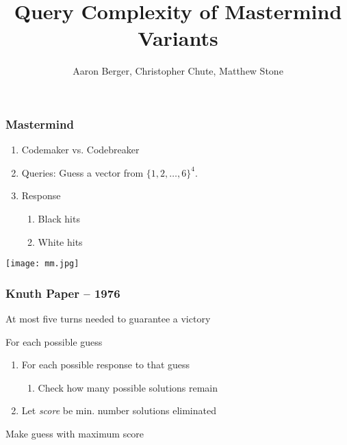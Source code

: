 \documentclass{beamer}
\title{Query Complexity of Mastermind Variants}
\author{Aaron Berger, Christopher Chute, Matthew Stone}
\begin{document}
    \begin{frame}
    	\maketitle
    \end{frame}

    \begin{frame}
    	\frametitle{Mastermind}
	   	\begin{enumerate}[label=\roman*.]
	    \item Codemaker vs. Codebreaker
	    \item Queries: Guess a vector from $\{1,2,\ldots,6\}^4$.	    		    
	    \item Response
	    	\begin{enumerate}[label=\roman*.]
			\item Black hits
			\item White hits
			\end{enumerate}
   	    \end{enumerate}
	\begin{center}
	\texttt{[image: mm.jpg]}
	\end{center}
    \end{frame}

    \begin{frame}
    	\frametitle{Knuth Paper -- 1976}
		At most five turns needed to guarantee a victory\vspace{\baselineskip}
		\begin{tcolorbox}[colback=green!5,colframe=green!40!black,title=Minimax]
		For each possible guess
			\begin{enumerate}[label=]
			\item For each possible response to that guess
				\begin{enumerate}[label=]
				\item Check how many possible solutions remain
				\end{enumerate}
			\item Let \textit{score} be min. number solutions eliminated
			\end{enumerate}
		Make guess with maximum score
		\end{tcolorbox}
    \end{frame}
 
\end{document}
